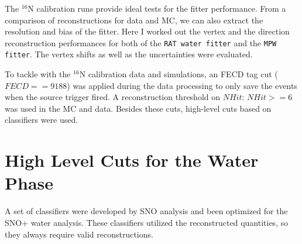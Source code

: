The $^{16}$N calibration runs provide ideal tests for the fitter performance. From a comparison of reconstructions for data and MC, we can also extract the resolution and bias of the fitter. Here I worked out the vertex and the direction reconstruction performances for both of the \texttt{RAT water fitter} and the \texttt{MPW fitter}. The vertex shifts as well as the uncertainties were evaluated. 

To tackle with the $^{16}$N calibration data and simulations, an FECD tag cut ($FECD==9188$) was applied during the data processing to only save the events when the source trigger fired. A reconstruction threshold on $NHit$: $NHit>=6$ was used in the MC and data. Besides these cuts, high-level cuts based on classifiers were used. 

\section{High Level Cuts for the Water Phase}\label{sect:high_level_cuts}
A set of classifiers were developed by SNO analysis and been optimized for the SNO+ water analysis\cite{highlevel}. These classifiers utilized the reconstructed quantities, so they always require valid reconstructions.

